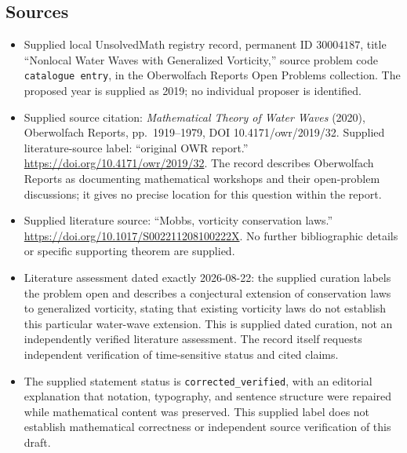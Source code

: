 \documentclass[11pt]{article}
\begin{document}
\subsection{Sources}
\begin{itemize}
\item Supplied local UnsolvedMath registry record, permanent ID \(30004187\), title ``Nonlocal Water Waves with Generalized Vorticity,'' source problem code \texttt{catalogue entry}, in the Oberwolfach Reports Open Problems collection. The proposed year is supplied as 2019; no individual proposer is identified.
\item Supplied source citation: \emph{Mathematical Theory of Water Waves} (2020), Oberwolfach Reports, pp.\ 1919--1979, DOI 10.4171/owr/2019/32. Supplied literature-source label: ``original OWR report.'' \url{https://doi.org/10.4171/owr/2019/32}. The record describes Oberwolfach Reports as documenting mathematical workshops and their open-problem discussions; it gives no precise location for this question within the report.
\item Supplied literature source: ``Mobbs, vorticity conservation laws.'' \url{https://doi.org/10.1017/S002211208100222X}. No further bibliographic details or specific supporting theorem are supplied.
\item Literature assessment dated exactly 2026-08-22: the supplied curation labels the problem open and describes a conjectural extension of conservation laws to generalized vorticity, stating that existing vorticity laws do not establish this particular water-wave extension. This is supplied dated curation, not an independently verified literature assessment. The record itself requests independent verification of time-sensitive status and cited claims.
\item The supplied statement status is \texttt{corrected\_verified}, with an editorial explanation that notation, typography, and sentence structure were repaired while mathematical content was preserved. This supplied label does not establish mathematical correctness or independent source verification of this draft.
\end{itemize}
\end{document}
